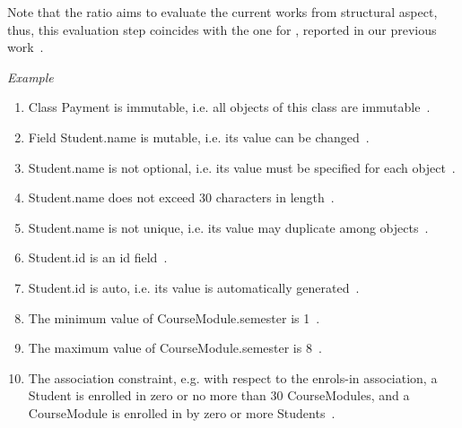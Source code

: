 Note that the ratio aims to evaluate the current works from structural aspect, thus, this evaluation step coincides with the one for \dcsl, reported in our previous work~\cite{le_domain_2018}. %

\textit{Example}
\begin{enumerate}
	\item Class Payment is immutable, i.e. all objects of this class are immutable~.
\item Field Student.name is mutable, i.e. its value can be changed~.
\item Student.name is not optional, i.e. its value must be specified for each object~.
\item Student.name does not exceed 30 characters in length~.
\item Student.name is not unique, i.e. its value may duplicate among objects~.
\item Student.id is an id field~.
\item Student.id is auto, i.e. its value is automatically generated~.
\item The minimum value of CourseModule.semester is 1~.
	\item The maximum value of CourseModule.semester is 8~.
	\item The association constraint, e.g. with respect to the enrols-in association, a Student is enrolled in zero or no more than 30 CourseModules,
	and a CourseModule is enrolled in by zero or more Students~.
\end{enumerate}